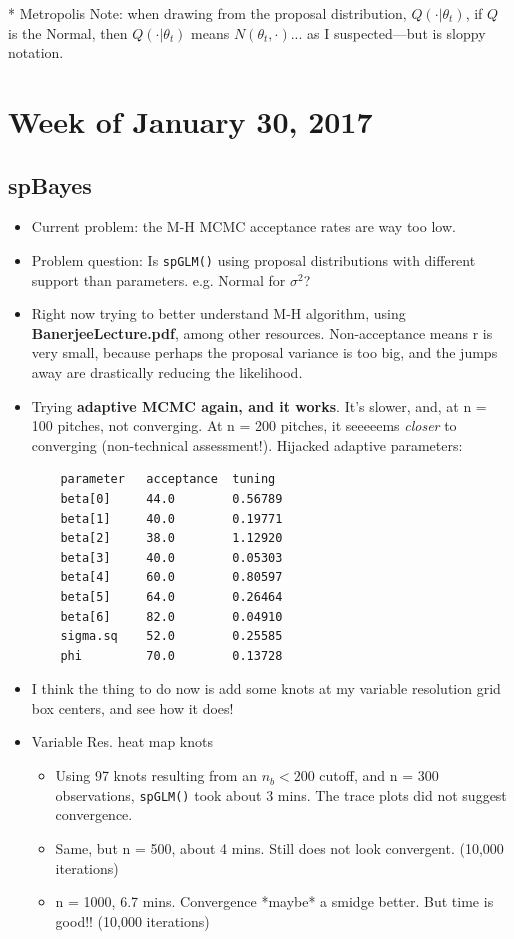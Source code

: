 \documentclass{article}
\begin{document}
* Metropolis Note: when drawing from the proposal distribution, $Q(\cdot|\theta_{t})$, if $Q$ is the Normal, then $Q(\cdot|\theta_{t})$ means $N(\theta_{t}, \cdot)$... as I suspected---but is sloppy notation.

\section*{Week of January 30, 2017}

\subsection*{spBayes} 
\begin{itemize}
\item Current problem: the M-H MCMC acceptance rates are way too low.
\item Problem question: Is \verb|spGLM()| using proposal distributions with different support than parameters. e.g. Normal for $\sigma^{2}$?
\item Right now trying to better understand M-H algorithm, using {\bf BanerjeeLecture.pdf}, among other resources. Non-acceptance means r is very small, because perhaps the proposal variance is too big, and the jumps away are drastically reducing the likelihood.
\item Trying {\bf adaptive MCMC again, and it works}. It's slower, and, at n = 100 pitches, not converging. At n = 200 pitches, it seeeeems {\it closer} to converging (non-technical assessment!). Hijacked adaptive parameters:
\begin{verbatim}
	parameter	acceptance	tuning
	beta[0]		44.0		0.56789
	beta[1]		40.0		0.19771
	beta[2]		38.0		1.12920
	beta[3]		40.0		0.05303
	beta[4]		60.0		0.80597
	beta[5]		64.0		0.26464
	beta[6]		82.0		0.04910
	sigma.sq	52.0		0.25585
	phi		    70.0		0.13728
\end{verbatim}
\item I think the thing to do now is add some knots at my variable resolution grid box centers, and see how it does!
\item Variable Res. heat map knots
      \begin{itemize}
      \item Using 97 knots resulting from an $n_{b} < 200$ cutoff, and n = 300 observations, \verb|spGLM()| took about 3 mins. The trace plots did not suggest convergence.
      \item Same, but n = 500, about 4 mins. Still does not look convergent. (10,000 iterations)
      \item n = 1000, 6.7 mins. Convergence *maybe* a smidge better. But time is good!! (10,000 iterations)

\end{itemize}
\end{itemize}
\end{document}
